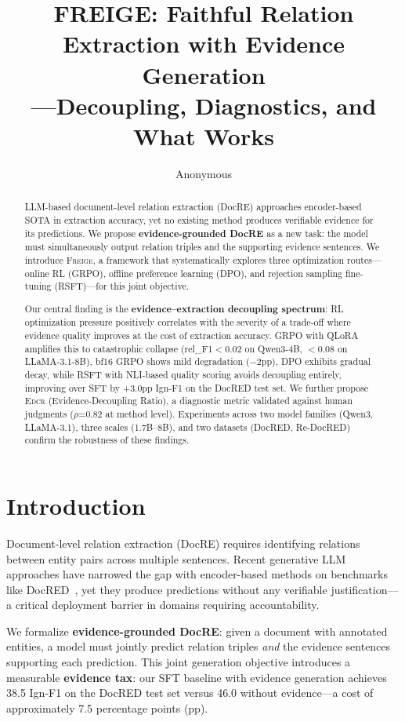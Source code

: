 \documentclass[11pt,a4paper]{article}
\title{FREIGE: Faithful Relation Extraction with Evidence Generation\\---Decoupling, Diagnostics, and What Works}
\author{Anonymous}
\newcommand{\ours}{\textsc{Freige}}
\newcommand{\edcr}{\textsc{Edcr}}
\begin{document}
\maketitle

\begin{abstract}
LLM-based document-level relation extraction (DocRE) approaches encoder-based SOTA in extraction accuracy, yet no existing method produces verifiable evidence for its predictions. We propose \textbf{evidence-grounded DocRE} as a new task: the model must simultaneously output relation triples and the supporting evidence sentences. We introduce \ours{}, a framework that systematically explores three optimization routes---online RL (GRPO), offline preference learning (DPO), and rejection sampling fine-tuning (RSFT)---for this joint objective.

Our central finding is the \textbf{evidence--extraction decoupling spectrum}: RL optimization pressure positively correlates with the severity of a trade-off where evidence quality improves at the cost of extraction accuracy. GRPO with QLoRA amplifies this to catastrophic collapse (rel\_F1$<$0.02 on Qwen3-4B, $<$0.08 on LLaMA-3.1-8B), bf16 GRPO shows mild degradation ($-$2pp), DPO exhibits gradual decay, while RSFT with NLI-based quality scoring avoids decoupling entirely, improving over SFT by +3.0pp Ign-F1 on the DocRED test set. We further propose \edcr{} (Evidence-Decoupling Ratio), a diagnostic metric validated against human judgments ($\rho$=0.82 at method level). Experiments across two model families (Qwen3, LLaMA-3.1), three scales (1.7B--8B), and two datasets (DocRED, Re-DocRED) confirm the robustness of these findings.
\end{abstract}

\section{Introduction}
\label{sec:intro}

Document-level relation extraction (DocRE) requires identifying relations between entity pairs across multiple sentences. Recent generative LLM approaches have narrowed the gap with encoder-based methods on benchmarks like DocRED~\cite{yao2019docred}, yet they produce predictions without any verifiable justification---a critical deployment barrier in domains requiring accountability.

We formalize \textbf{evidence-grounded DocRE}: given a document with annotated entities, a model must jointly predict relation triples \emph{and} the evidence sentences supporting each prediction. This joint generation objective introduces a measurable \textbf{evidence tax}: our SFT baseline with evidence generation achieves 38.5 Ign-F1 on the DocRED test set versus 46.0 without evidence---a cost of approximately 7.5 percentage points (pp).
\end{document}
